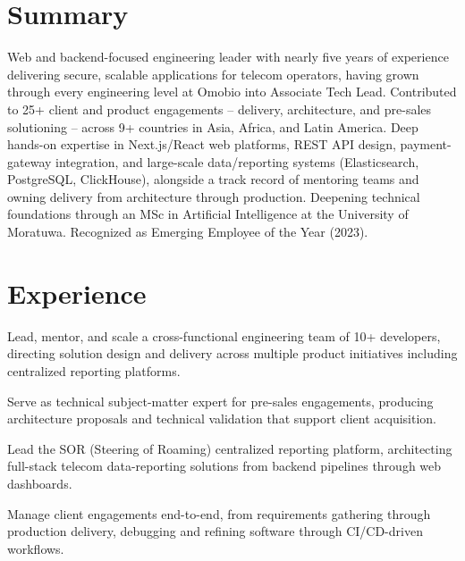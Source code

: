 \documentclass[10.5pt]{article}
\begin{document}

\section*{Summary}
Web and backend-focused engineering leader with nearly five years of experience delivering secure, scalable applications for telecom operators, having grown through every engineering level at Omobio into Associate Tech Lead. Contributed to 25+ client and product engagements -- delivery, architecture, and pre-sales solutioning -- across 9+ countries in Asia, Africa, and Latin America. Deep hands-on expertise in Next.js/React web platforms, REST API design, payment-gateway integration, and large-scale data/reporting systems (Elasticsearch, PostgreSQL, ClickHouse), alongside a track record of mentoring teams and owning delivery from architecture through production. Deepening technical foundations through an MSc in Artificial Intelligence at the University of Moratuwa. Recognized as Emerging Employee of the Year (2023).

\section*{Experience}

\begin{cvitems}
  \item Lead, mentor, and scale a cross-functional engineering team of 10+ developers, directing solution design and delivery across multiple product initiatives including centralized reporting platforms.
  \item Serve as technical subject-matter expert for pre-sales engagements, producing architecture proposals and technical validation that support client acquisition.
  \item Lead the SOR (Steering of Roaming) centralized reporting platform, architecting full-stack telecom data-reporting solutions from backend pipelines through web dashboards.
  \item Manage client engagements end-to-end, from requirements gathering through production delivery, debugging and refining software through CI/CD-driven workflows.
\end{cvitems}
\end{document}
